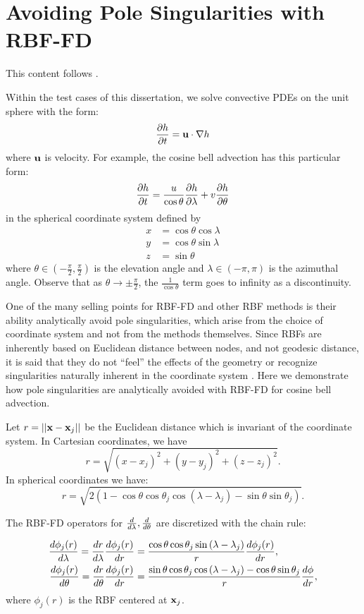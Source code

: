 \chapter{Avoiding Pole Singularities with RBF-FD}
This content follows \cite{FlyerWright07,FlyerWright09}. 

Within the test cases of this dissertation, we solve convective PDEs on the unit sphere with the form: 
$$
\frac{\partial h}{\partial t} = \mathbf{u} \cdot \nabla h
$$
where $\mathbf{u}$ is velocity. For example, the cosine bell advection has this particular form:
\begin{equation}
\frac{\partial h}{\partial t} = \frac{u}{\cos{\theta}} \frac{\partial h}{\partial \lambda} + v \frac{\partial h}{\partial \theta} \label{eq:cosine_bell_appendix}
\end{equation}
in the spherical coordinate system defined by
\begin{align*}
x & = \cos{\theta}\cos{\lambda} \\
y & = \cos{\theta}\sin{\lambda} \\
z & = \sin{\theta}
\end{align*}
where $\theta \in (-\frac{\pi}{2}, \frac{\pi}{2})$ is the elevation angle and $\lambda \in (-\pi,\pi)$ is the azimuthal angle.
Observe that as $\theta \rightarrow \pm \frac{\pi}{2}$, the $\frac{1}{\cos{\theta}}$ term goes to infinity as a discontinuity. 

One of the many selling points for RBF-FD and other RBF methods is their ability analytically avoid pole singularities, which arise from the choice of coordinate system and not from the methods themselves. Since RBFs are inherently based on Euclidean distance between nodes, and not geodesic distance, it is said that they do not ``feel'' the effects of the geometry or recognize singularities naturally inherent in the coordinate system \cite{FlyerWright07}. 
Here we demonstrate how pole singularities are analytically avoided with RBF-FD for cosine bell advection.  


Let $r = || \mathbf{x} - \mathbf{x}_j ||$ be the Euclidean distance which is invariant of the coordinate system. In Cartesian coordinates, we have
$$
r = \sqrt{(x-x_j)^2 + (y-y_j)^2 + (z-z_j)^2}.
$$
In spherical coordinates we have:
$$
r = \sqrt{2(1-\cos{\theta}\cos{\theta_j}\cos{(\lambda-\lambda_j)} - \sin{\theta}\sin{\theta_j})}.
$$

The RBF-FD operators for $\frac{d }{d \lambda}, \frac{d }{d \theta}$ are discretized with the chain rule: 

\begin{align}
\frac{d \phi_{j}(r)}{d \lambda} = \frac{d r}{d \lambda} \frac{d \phi_{j}(r)}{d r} & = \frac{\cos{\theta}\cos{\theta_j}\sin{(\lambda - \lambda_j)}}{r} \frac{d \phi_j(r)}{d r}, \label{eq:rbfffd_d_dlambda} \\
\frac{d \phi_{j}(r)}{d \theta} = \frac{d r}{d \theta} \frac{d \phi_{j}(r)}{d r} & = \frac{\sin{\theta}\cos{\theta_j}\cos{(\lambda-\lambda_j)} - \cos{\theta}\sin{\theta_j}}{r} \frac{d \phi}{d r}, \label{eq:rbfffd_d_dtheta}
\end{align}
where $\phi_{j}(r)$ is the RBF centered at $\mathbf{x}_{j}$. 


